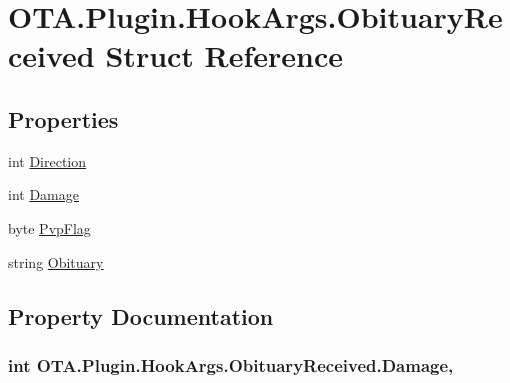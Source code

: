 \hypertarget{struct_o_t_a_1_1_plugin_1_1_hook_args_1_1_obituary_received}{}\section{O\+T\+A.\+Plugin.\+Hook\+Args.\+Obituary\+Received Struct Reference}
\label{struct_o_t_a_1_1_plugin_1_1_hook_args_1_1_obituary_received}
\subsection*{Properties}
\begin{DoxyCompactItemize}
\item 
int \hyperlink{struct_o_t_a_1_1_plugin_1_1_hook_args_1_1_obituary_received_ae09ab07427be3dc53726c021875c7bc9}{Direction}
\item 
int \hyperlink{struct_o_t_a_1_1_plugin_1_1_hook_args_1_1_obituary_received_ae0a017adb3267d0d26840f0657f21c48}{Damage}
\item 
byte \hyperlink{struct_o_t_a_1_1_plugin_1_1_hook_args_1_1_obituary_received_a5982ac63b8fed77e7d159932a68de8b2}{Pvp\+Flag}
\item 
string \hyperlink{struct_o_t_a_1_1_plugin_1_1_hook_args_1_1_obituary_received_af26ebfbfed5c412c6cf754f10ae35fa1}{Obituary}
\end{DoxyCompactItemize}


\subsection{Property Documentation}
\hypertarget{struct_o_t_a_1_1_plugin_1_1_hook_args_1_1_obituary_received_ae0a017adb3267d0d26840f0657f21c48}{}
\subsubsection[{Damage}]{\setlength{\rightskip}{0pt plus 5cm}int O\+T\+A.\+Plugin.\+Hook\+Args.\+Obituary\+Received.\+Damage\hspace{0.3cm}{\ttfamily [get]}, {\ttfamily [set]}}\label{struct_o_t_a_1_1_plugin_1_1_hook_args_1_1_obituary_received_ae0a017adb3267d0d26840f0657f21c48}
\hypertarget{struct_o_t_a_1_1_plugin_1_1_hook_args_1_1_obituary_received_ae09ab07427be3dc53726c021875c7bc9}{}

